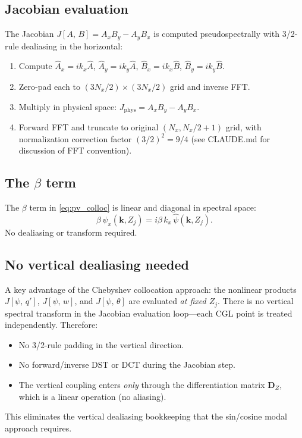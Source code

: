 \documentclass[11pt]{article}
\newcommand{\Jac}[2]{J\!\left[#1,\,#2\right]}
\newcommand{\hhat}[1]{\widehat{#1}}
\newcommand{\Dvec}{\bm{D}}
\begin{document}
\subsection{Jacobian evaluation}

The Jacobian $\Jac{A}{B} = A_x B_y - A_y B_x$ is computed pseudospectrally with 3/2-rule dealiasing in the horizontal:
\begin{enumerate}[nosep]
\item Compute $\hhat{A}_x = ik_x\hhat{A}$, $\hhat{A}_y = ik_y\hhat{A}$, $\hhat{B}_x = ik_x\hhat{B}$, $\hhat{B}_y = ik_y\hhat{B}$.
\item Zero-pad each to $(3N_x/2) \times (3N_x/2)$ grid and inverse FFT.
\item Multiply in physical space: $J_{\mathrm{phys}} = A_x B_y - A_y B_x$.
\item Forward FFT and truncate to original $(N_x, N_x/2+1)$ grid, with normalization correction factor $(3/2)^{2} = 9/4$ (see CLAUDE.md for discussion of FFT convention).
\end{enumerate}

\subsection{The $\beta$ term}

The $\beta$ term in \eqref{eq:pv_colloc} is linear and diagonal in spectral space:
\begin{equation}
\widehat{\beta\,\psi_x}(\bm{k}, Z_j) = i\beta\, k_x\, \hhat\psi(\bm{k}, Z_j).
\end{equation}
No dealiasing or transform required.

\subsection{No vertical dealiasing needed}
\label{sec:no_vert_dealiasing}

A key advantage of the Chebyshev collocation approach: the nonlinear products $\Jac{\psi}{q'}$, $\Jac{\psi}{w}$, and $\Jac{\psi}{\theta}$ are evaluated \emph{at fixed $Z_j$}. There is no vertical spectral transform in the Jacobian evaluation loop---each CGL point is treated independently. Therefore:
\begin{itemize}[nosep]
\item No 3/2-rule padding in the vertical direction.
\item No forward/inverse DST or DCT during the Jacobian step.
\item The vertical coupling enters \emph{only} through the differentiation matrix $\Dvec_Z$, which is a linear operation (no aliasing).
\end{itemize}
This eliminates the vertical dealiasing bookkeeping that the sin/cosine modal approach requires.
\end{document}
